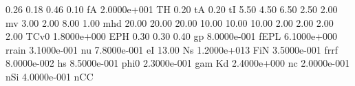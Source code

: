 0.26 0.18 0.46 0.10 fA
2.0000e+001    TH
0.20           tA
0.20           tI
5.50 4.50 6.50 2.50 2.00 mv
3.00 2.00 8.00 1.00 mhd
20.00 20.00 20.00 10.00 10.00 10.00 2.00 2.00 2.00 2.00 TCv0
1.8000e+000   EPH
0.30 0.30 0.40 gp
8.0000e-001  fEPL
6.1000e+000 rrain
3.1000e-001    nu
7.8000e-001    eI
13.00          Ns
1.2000e+013   FiN
3.5000e-001  frrf
8.0000e-002    hs
8.5000e-001  phi0
2.3000e-001   gam
    Kd
2.4000e+000    nc
2.0000e-001   nSi
4.0000e-001   nCC

